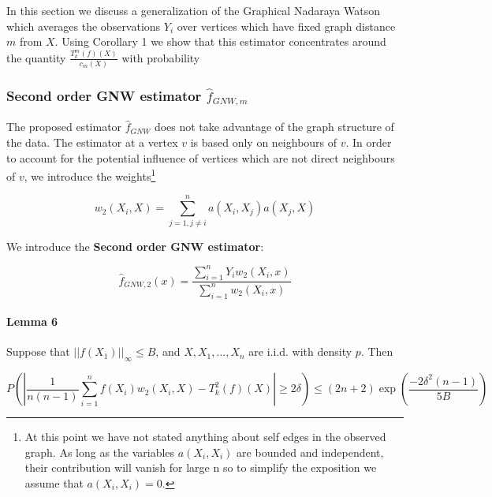 \documentclass{article}
\begin{document}
In this section we discuss a generalization of the Graphical Nadaraya Watson which averages the observations $Y_i$ over vertices which have fixed graph distance $m$ from $X$. Using Corollary 1 we show that this estimator concentrates around the quantity $\frac{T_k^m(f)(X)}{c_m(X)}$ with probability 

\subsubsection{Second order GNW estimator \texorpdfstring{$\hat{f}_{GNW,m}$}{Lg}}

The proposed estimator $\hat{f}_{GNW}$ does not take advantage of the graph structure of the data. The estimator at a vertex
$v$ is based only on neighbours of 
$v$. In order to account for the potential influence of vertices which are not direct neighbours of $v$, we introduce the weights\footnote{ At this point we have not stated anything about self edges in the observed graph. As long as the variables $a(X_i,X_i)$ are
bounded and 
independent, their contribution will vanish for large n so to simplify the exposition we assume that $a(X_i,X_i)=0$.
}


\begin{equation*}
    w_{2}(X_i,X)=\sum_{j=1,j\neq i}^na(X_i,X_j)a(X_j,X)
\end{equation*}

We introduce the \textbf{Second order GNW estimator}:

\begin{equation*}
    \hat{f}_{GNW,2}(x)=\frac{\sum_{i=1}^n Y_i
    w_2(X_i,x)}{\sum_{i=1}^n w_2(X_i,x)}
\end{equation*} 
\paragraph{Lemma 6} Suppose that $||f(X_1)||_{\infty}\leq B$, and $X,X_1,...,X_n$ are i.i.d. with density $p$. Then

\begin{equation*}
     P(|\frac{1}{n(n-1)}\sum_{i=1}^n f(X_i)w_2(X_i,X)-T_k^2(f)(X)|\geq 2\delta)\leq (2n+2)\exp(\frac{-2\delta^2(n-1)}{5B})
\end{equation*}
\end{document}
